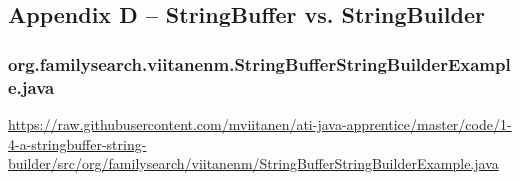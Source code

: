 \subsection*{Appendix D -- StringBuffer vs. StringBuilder} \label{App:AppendixD}

\subsubsection*{org.familysearch.viitanenm.StringBufferStringBuilderExample.java}
\noindent
\begin{minipage}{.6in}
\end{minipage}
\begin{minipage}{6in}
  \url{https://raw.githubusercontent.com/mviitanen/ati-java-apprentice/master/code/1-4-a-stringbuffer-string-builder/src/org/familysearch/viitanenm/StringBufferStringBuilderExample.java}
\end{minipage}